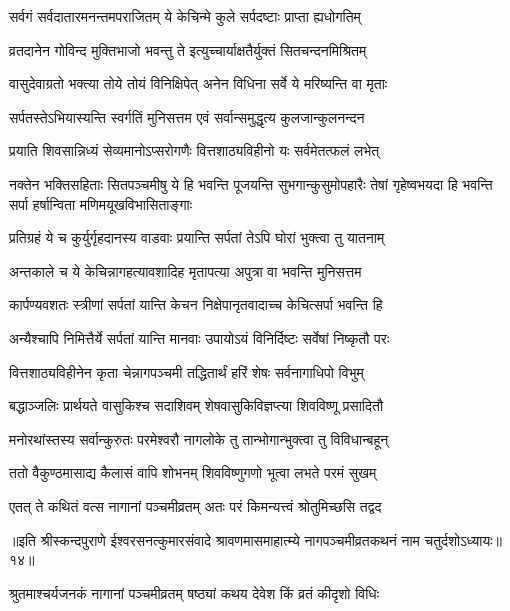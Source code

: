 \twolineshloka
{सर्वगं सर्वदातारमनन्तमपराजितम्}
{ये केचिन्मे कुले सर्पदष्टाः प्राप्ता ह्यधोगतिम्} %

\twolineshloka
{व्रतदानेन गोविन्द मुक्तिभाजो भवन्तु ते}
{इत्युच्चार्याक्षतैर्युक्तं सितचन्दनमिश्रितम्} %

\twolineshloka
{वासुदेवाग्रतो भक्त्या तोये तोयं विनिक्षिपेत्}
{अनेन विधिना सर्वे ये मरिष्यन्ति वा मृताः} %

\twolineshloka
{सर्पतस्तेऽभियास्यन्ति स्वर्गतिं मुनिसत्तम}
{एवं सर्वान्समुद्धृत्य कुलजान्कुलनन्दन} %

\twolineshloka
{प्रयाति शिवसान्निध्यं सेव्यमानोऽप्सरोगणैः}
{वित्तशाठ्यविहीनो यः सर्वमेतत्फलं लभेत्} %

\twolineshloka
{नक्तेन भक्तिसहिताः सितपञ्चमीषु ये हि भवन्ति पूजयन्ति सुभगान्कुसुमोपहारैः}
{तेषां गृहेष्वभयदा हि भवन्ति सर्पा हर्षान्विता मणिमयूखविभासिताङ्गाः} %

\twolineshloka
{प्रतिग्रहं ये च कुर्युर्गृहदानस्य वाडवाः}
{प्रयान्ति सर्पतां तेऽपि घोरां भुक्त्वा तु यातनाम्} %

\twolineshloka
{अन्तकाले च ये केचिन्नागहत्यावशादिह}
{मृतापत्या अपुत्रा वा भवन्ति मुनिसत्तम} %

\twolineshloka
{कार्पण्यवशतः स्त्रीणां सर्पतां यान्ति केचन}
{निक्षेपानृतवादाच्च केचित्सर्पा भवन्ति हि} %

\twolineshloka
{अन्यैश्चापि निमित्तैर्ये सर्पतां यान्ति मानवाः}
{उपायोऽयं विनिर्दिष्टः सर्वेषां निष्कृतौ परः} %

\twolineshloka
{वित्तशाठ्यविहीनेन कृता चेन्नागपञ्चमी}
{तद्धितार्थं हरिं शेषः सर्वनागाधिपो विभुम्} %

\twolineshloka
{बद्धाञ्जलिः प्रार्थयते वासुकिश्च सदाशिवम्}
{शेषवासुकिविज्ञप्त्या शिवविष्णू प्रसादितौ} %

\twolineshloka
{मनोरथांस्तस्य सर्वान्कुरुतः परमेश्वरौ}
{नागलोके तु तान्भोगान्भुक्त्वा तु विविधान्बहून्} %

\twolineshloka
{ततो वैकुण्ठमासाद्य कैलासं वापि शोभनम्}
{शिवविष्णुगणो भूत्वा लभते परमं सुखम्} %

\twolineshloka
{एतत् ते कथितं वत्स नागानां पञ्चमीव्रतम्}
{अतः परं किमन्यत्त्वं श्रोतुमिच्छसि तद्वद} %


{॥इति श्रीस्कन्दपुराणे ईश्वरसनत्कुमारसंवादे श्रावणमासमाहात्म्ये नागपञ्चमीव्रतकथनं नाम चतुर्दशोऽध्यायः॥१४॥}





\twolineshloka
{श्रुतमाश्चर्यजनकं नागानां पञ्चमीव्रतम्}
{षष्ठ्यां कथय देवेश किं व्रतं कीदृशो विधिः} %


